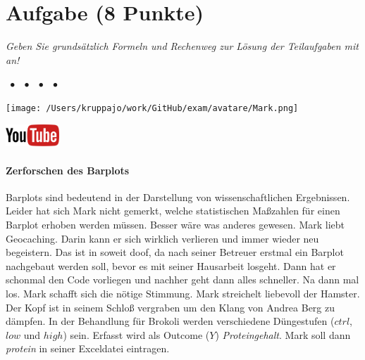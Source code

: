 \documentclass[a4paper, 9pt]{scrartcl}\usepackage[]{graphicx}\usepackage[]{xcolor}
\begin{document}
 
\clearpage

\section{Aufgabe \hfill (8 Punkte)}

\textit{Geben Sie grundsätzlich Formeln und Rechenweg zur Lösung der Teilaufgaben mit an!} \\[1Ex]
 

 
\ifcollection
\begin{flushright}
\tiny\vspace{-3Ex}
\textbf{\examinhaltstart}
\exammodulemathstat $\;\bullet$
\exammodulestat $\;\bullet$
\exammodulestatbbv $\;\bullet$
\exammodulestatversuch $\;\bullet$
\exammodulebiostat
\vspace{-4Ex}
\end{flushright}
\begin{minipage}[t]{0.5\textwidth}
\texttt{[image: /Users/kruppajo/work/GitHub/exam/avatare/Mark.png]}
\end{minipage}
\begin{minipage}[t]{0.5\textwidth}
\hfill
\href{https://youtu.be/t0WYa_LVc5o}{\includegraphics[width = 2cm]{img/youtube}}
\end{minipage}
\vspace{-3ex}
\fi



\ifcollection
\paragraph{Zerforschen des Barplots}
\fi

Barplots sind bedeutend in der Darstellung von wissenschaftlichen Ergebnissen. Leider hat sich Mark nicht gemerkt, welche statistischen Maßzahlen für einen Barplot erhoben werden müssen. Besser wäre was anderes gewesen. Mark liebt Geocaching. Darin kann er sich wirklich verlieren und immer wieder neu begeistern. Das ist in soweit doof, da nach seiner Betreuer erstmal ein Barplot nachgebaut werden soll, bevor es mit seiner Hausarbeit losgeht. Dann hat er schonmal den \Rlogo Code vorliegen und nachher geht dann alles schneller. Na dann mal los. Mark schafft sich die nötige Stimmung. Mark streichelt liebevoll der Hamster. Der Kopf ist in seinem Schloß vergraben um den Klang von Andrea Berg zu dämpfen. In der Behandlung für Brokoli werden verschiedene Düngestufen ($ctrl$, $low$ und $high$) sein. Erfasst wird als Outcome ($Y$) \textit{Proteingehalt}. Mark soll dann \textit{protein} in seiner Exceldatei eintragen.
\end{document}
